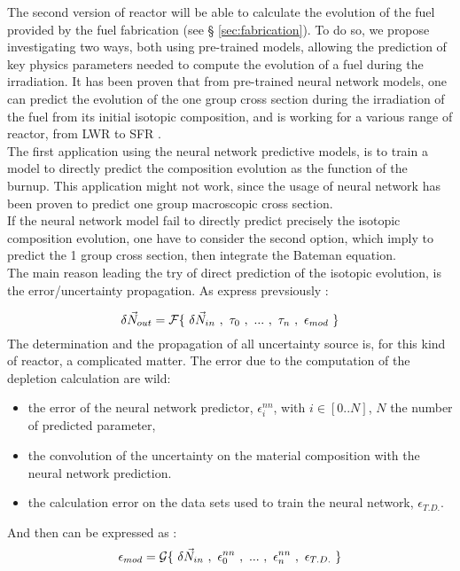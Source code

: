 \documentclass[dvips,12pt]{article}
\begin{document}
The second version of reactor will be able to
calculate the evolution of the fuel provided by
the fuel fabrication (see \S
\ref{sec:fabrication}).  To do so, we propose
investigating two ways, both using pre-trained
models, allowing the prediction of key physics
parameters needed to compute the evolution of a
fuel during the irradiation. It has been proven
that from pre-trained neural network models, one
can predict the evolution of the one group cross
section during the irradiation of the fuel from
its initial isotopic composition, and is working
for a various range of reactor, from LWR to SFR
\cite{Leniau Neural networks,
  Leniau.PHYSOR.2016}.\\ 
The first application using the neural network
predictive models, is to train a model to directly
predict the composition evolution as the function
of the burnup. This application might not work,
since the usage of neural network has been proven
to predict one group macroscopic cross
section.\\ 
If the neural network model fail to directly
predict precisely the isotopic composition
evolution, one have to consider the second option,
which imply to predict the 1 group cross section,
then integrate the Bateman equation.\\

The main reason leading the try of direct
prediction of the isotopic evolution, is the
error/uncertainty propagation. As express
prevsiously :

\begin{equation}
\delta \vec{N}_{out} = {\cal F}\{~\delta\vec{N}_{in}~,~\tau_0~,~...~,~\tau_n~,~\epsilon_{mod}~\}
\end{equation}
The determination and the propagation of all
uncertainty source is, for this kind of reactor, a
complicated matter. The error due to the
computation of the depletion calculation are wild:
\begin{itemize}
\item the error of the neural network predictor,
  $\epsilon^{nn}_{i}$, with $i\in[0..N]$, $N$ the
  number of predicted parameter,
\item the convolution of the uncertainty on the
  material composition with the neural network
  prediction.
\item the calculation error on the data sets used
  to train the neural network, $\epsilon_{T.D.}$.
\end{itemize}
And then can be expressed as :
\begin{equation}
\epsilon_{mod} = {\cal G}\{~\delta\vec{N}_{in}~,~\epsilon^{nn}_{0}~,~...~,~\epsilon^{nn}_{n}~,~\epsilon_{T.D.}~\}
\end{equation}
\end{document}
